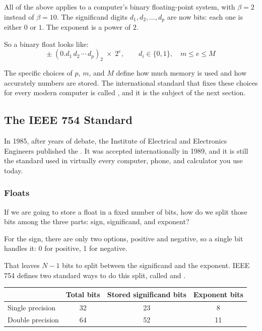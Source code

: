 All of the above applies to a computer's binary floating-point system,
with $\beta = 2$ instead of $\beta = 10$.
The significand digits $d_1, d_2, \ldots, d_p$ are now bits: each one is either
$0$ or $1$.
The exponent is a power of $2$.

So a binary float looks like:
\[
  \pm \;(0.d_1\, d_2\, \cdots\, d_p)_2 \;\times\; 2^e,
  \qquad d_i \in \{0,1\}, \quad m \leq e \leq M
\]

The specific choices of $p$, $m$, and $M$ define how much memory is used and
how accurately numbers are stored.
The international standard that fixes these choices for every modern computer
is called , and it is the subject of the next
section.

\subsection{The IEEE 754 Standard}

In 1985, after years of debate, the Institute of Electrical
and Electronics Engineers published the
. It was accepted internationally
in 1989, and it is still the standard used in virtually every computer, phone, and
calculator you use today. 

\subsubsection{Floats}

If we are going to store a float in a fixed number of bits, how do we split those bits
among the three parts: sign, significand, and exponent?

For the sign, there are only two options, positive and negative, so a single bit
handles it: 0 for positive, 1 for negative.

That leaves $N - 1$ bits to split between the significand and the exponent. IEEE 754
defines two standard ways to do this split, called
 and
.

\begin{center}
\begin{tabular}{lccc}
    \hline
    & Total bits & Stored significand bits & Exponent bits \\
    \hline
    Single precision & 32 & 23 & 8 \\
    Double precision & 64 & 52 & 11 \\
    \hline
\end{tabular}
\end{center}

